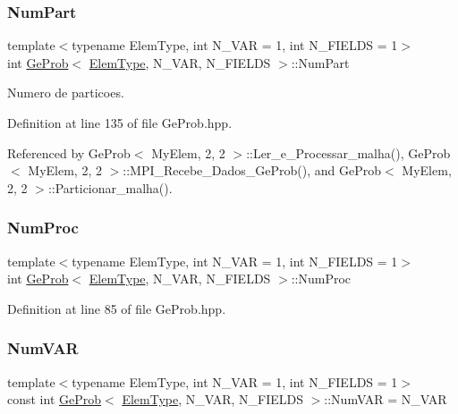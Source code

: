 \subsubsection{\texorpdfstring{Num\+Part}{NumPart}}
{\footnotesize\ttfamily template$<$typename Elem\+Type, int N\+\_\+\+V\+AR = 1, int N\+\_\+\+F\+I\+E\+L\+DS = 1$>$ \\
int \hyperlink{classGeProb}{Ge\+Prob}$<$ \hyperlink{spectral_8h_aaa2c1a7b2d1b12c590d730fe6ac839fa}{Elem\+Type}, N\+\_\+\+V\+AR, N\+\_\+\+F\+I\+E\+L\+DS $>$\+::Num\+Part\hspace{0.3cm}{\ttfamily [protected]}}



Numero de particoes. 



Definition at line 135 of file Ge\+Prob.\+hpp.



Referenced by Ge\+Prob$<$ My\+Elem, 2, 2 $>$\+::\+Ler\+\_\+e\+\_\+\+Processar\+\_\+malha(), Ge\+Prob$<$ My\+Elem, 2, 2 $>$\+::\+M\+P\+I\+\_\+\+Recebe\+\_\+\+Dados\+\_\+\+Ge\+Prob(), and Ge\+Prob$<$ My\+Elem, 2, 2 $>$\+::\+Particionar\+\_\+malha().

\mbox{\label{classGeProb_a8678d8a8dc17175ba98761beeccc0e04}} 
\subsubsection{\texorpdfstring{Num\+Proc}{NumProc}}
{\footnotesize\ttfamily template$<$typename Elem\+Type, int N\+\_\+\+V\+AR = 1, int N\+\_\+\+F\+I\+E\+L\+DS = 1$>$ \\
int \hyperlink{classGeProb}{Ge\+Prob}$<$ \hyperlink{spectral_8h_aaa2c1a7b2d1b12c590d730fe6ac839fa}{Elem\+Type}, N\+\_\+\+V\+AR, N\+\_\+\+F\+I\+E\+L\+DS $>$\+::Num\+Proc\hspace{0.3cm}{\ttfamily [protected]}}



Definition at line 85 of file Ge\+Prob.\+hpp.

\mbox{\label{classGeProb_ac6d9c06150838e892ed3eaa1b60bac5d}} 
\subsubsection{\texorpdfstring{Num\+V\+AR}{NumVAR}}
{\footnotesize\ttfamily template$<$typename Elem\+Type, int N\+\_\+\+V\+AR = 1, int N\+\_\+\+F\+I\+E\+L\+DS = 1$>$ \\
const int \hyperlink{classGeProb}{Ge\+Prob}$<$ \hyperlink{spectral_8h_aaa2c1a7b2d1b12c590d730fe6ac839fa}{Elem\+Type}, N\+\_\+\+V\+AR, N\+\_\+\+F\+I\+E\+L\+DS $>$\+::Num\+V\+AR = N\+\_\+\+V\+AR\hspace{0.3cm}{\ttfamily [protected]}}



